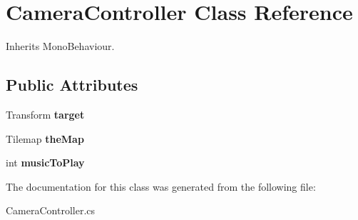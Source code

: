\hypertarget{class_camera_controller}{}\section{Camera\+Controller Class Reference}
\label{class_camera_controller}


Inherits Mono\+Behaviour.

\subsection*{Public Attributes}
\begin{DoxyCompactItemize}
\item 
\mbox{\label{class_camera_controller_a0a48b454b4a2bb8dbfc08e64b8c3e8e6}} 
Transform {\bfseries target}
\item 
\mbox{\label{class_camera_controller_a1eee171d5f69e7a84dae2a195e12f466}} 
Tilemap {\bfseries the\+Map}
\item 
\mbox{\label{class_camera_controller_adebfffee863316b5cf343da060e5597b}} 
int {\bfseries music\+To\+Play}
\end{DoxyCompactItemize}


The documentation for this class was generated from the following file\+:\begin{DoxyCompactItemize}
\item 
Camera\+Controller.\+cs\end{DoxyCompactItemize}
